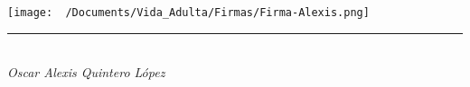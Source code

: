 \vspace*{\fill} %
\noindent
\begin{flushright}
    \texttt{[image: ~/Documents/Vida\_Adulta/Firmas/Firma-Alexis.png]}\\[-1ex]
    \vspace*{-0.6cm} %
    \rule{4.5cm}{1pt}\\
    \textit{Oscar Alexis Quintero López}\\
    \vspace*{4mm}
    \end{flushright}
